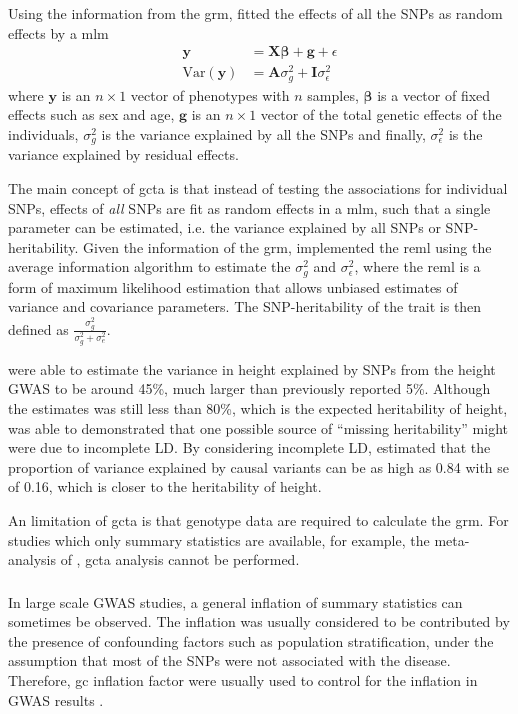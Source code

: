 	Using the information from the \gls{grm}, \citet{Yang2011} fitted the effects of all the \glspl{SNP} as random effects by a \gls{mlm}
	\begin{align}
	\boldsymbol{y} &= \boldsymbol{X\beta}+\boldsymbol{g}+\epsilon\\
	\mathrm{Var}(\boldsymbol{y}) &= \boldsymbol{A}\sigma_g^2+\boldsymbol{I}\sigma_\epsilon^2
	\end{align}
	where $\boldsymbol{y}$ is an $n\times 1$ vector of phenotypes with $n$ samples, $\boldsymbol{\beta}$ is a vector of fixed effects such as sex and age, $\boldsymbol{g}$ is an $n\times 1$ vector of the total genetic effects of the individuals, $\sigma_g^2$ is the variance explained by all the \glspl{SNP} and finally, $\sigma_\epsilon^2$ is the variance explained by residual effects.

	The main concept of \gls{gcta} is that instead of testing the associations for individual \glspl{SNP}, effects of \emph{all} \glspl{SNP} are fit as random effects in a \gls{mlm}, such that a single parameter can be estimated, i.e. the variance explained by all \glspl{SNP} or \gls{SNP}-heritability.
	Given the information of the \gls{grm}, \citet{Yang2011} implemented the \gls{reml} using the average information algorithm to estimate the $\sigma_g^2$ and $\sigma_\epsilon^2$, where the \gls{reml} is a form of maximum likelihood estimation that allows unbiased estimates of variance and covariance parameters.
	The \gls{SNP}-heritability of the trait is then defined as $\frac{\sigma_g^2}{\sigma_g^2+\sigma_e^2}$.

	\citet{Yang2010a} were able to estimate the variance in height explained by \glspl{SNP} from the height \gls{GWAS} to be around 45\%, much larger than previously reported 5\%.
	Although the estimates was still less than 80\%, which is the expected heritability of height, \citet{Yang2010a} was able to demonstrated that one possible source of ``missing heritability'' might were due to incomplete \gls{LD}.
	By considering incomplete \gls{LD}, \citet{Yang2010a} estimated that the proportion of variance explained by causal variants can be as high as 0.84 with \gls{se} of 0.16, which is closer to the heritability of height.
	
	An limitation of \gls{gcta} is that genotype data are required to calculate the \gls{grm}.
	For studies which only summary statistics are available, for example, the meta-analysis of , \gls{gcta} analysis cannot be performed.
	
	\subsubsection{}
	In large scale \gls{GWAS} studies, a general inflation of summary statistics can sometimes be observed.
	The inflation was usually considered to be contributed by the presence of confounding factors such as population stratification, under the assumption that most of the \glspl{SNP} were not associated with the disease.
	Therefore, \gls{gc} inflation factor were usually used to control for the inflation in \gls{GWAS} results \citep{Zheng2006}.
	
